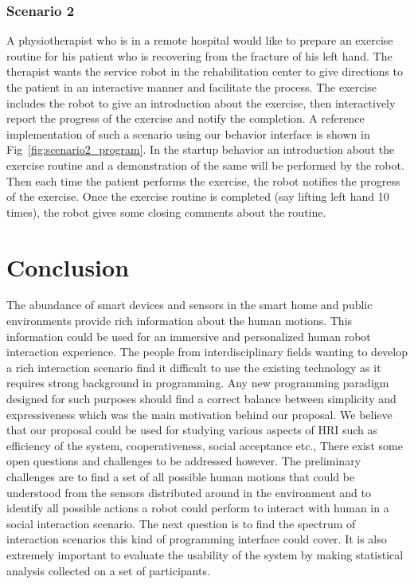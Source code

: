 \documentclass{llncs}
\begin{document}
\subsubsection{Scenario 2}%
A physiotherapist who is in a remote hospital would like to prepare an exercise routine for his patient who is recovering from the fracture of his left hand. The therapist wants the service robot in the rehabilitation center to give directions to the patient in an interactive manner and facilitate the process. The exercise includes the robot to give an introduction about the exercise, then interactively report the progress of the exercise and notify the completion. A reference implementation of such a scenario using our behavior interface is shown in Fig~\ref{fig:scenario2_program}. In the startup behavior an introduction about the exercise routine and a demonstration of the same will be performed by the robot. Then each time the patient performs the exercise, the robot notifies the progress of the exercise. Once the exercise routine is completed (say lifting left hand 10 times), the robot gives some closing comments about the routine.
\section{Conclusion}
The abundance of smart devices and sensors in the smart home and public environments provide rich information about the human motions. This information could be used for an immersive and personalized human robot interaction experience. The people from interdisciplinary fields wanting to develop a rich interaction scenario find it difficult to use the existing technology as it requires strong background in programming. Any new programming paradigm designed for such purposes should find a correct balance between simplicity and expressiveness which was the main motivation behind our proposal. We believe that our proposal could be used for studying various aspects of HRI such as efficiency of the system, cooperativeness, social acceptance etc., There exist some open questions and challenges to be addressed however. The preliminary challenges are to find a set of all possible human motions that could be understood from the sensors distributed around in the environment and to identify all possible actions a robot could perform to interact with human in a social interaction scenario. The next question is to find the spectrum of interaction scenarios this kind of programming interface could cover. It is also extremely important to evaluate the usability of the system by making statistical analysis collected on a set of participants.
\end{document}
